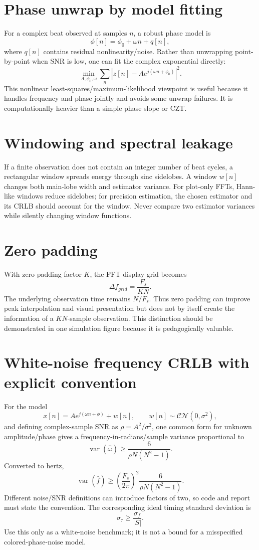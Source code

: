 \documentclass[11pt]{article}
\begin{document}
\section{Phase unwrap by model fitting}
For a complex beat observed at samples $n$, a robust phase model is
\[
\phi[n]=\phi_0+\omega n + q[n],
\]
where $q[n]$ contains residual nonlinearity/noise. Rather than unwrapping point-by-point when SNR is low, one can fit the complex exponential directly:
\[
\min_{A,\phi_0,\omega}\sum_n\left|z[n]-Ae^{j(\omega n+\phi_0)}\right|^2.
\]
This nonlinear least-squares/maximum-likelihood viewpoint is useful because it handles frequency and phase jointly and avoids some unwrap failures. It is computationally heavier than a simple phase slope or CZT.

\section{Windowing and spectral leakage}
If a finite observation does not contain an integer number of beat cycles, a rectangular window spreads energy through sinc sidelobes. A window $w[n]$ changes both main-lobe width and estimator variance. For plot-only FFTs, Hann-like windows reduce sidelobes; for precision estimation, the chosen estimator and its CRLB should account for the window. Never compare two estimator variances while silently changing window functions.

\section{Zero padding}
With zero padding factor $K$, the FFT display grid becomes
\[
\Delta f_{grid}=\frac{F_s}{KN}.
\]
The underlying observation time remains $N/F_s$. Thus zero padding can improve peak interpolation and visual presentation but does not by itself create the information of a $KN$-sample observation. This distinction should be demonstrated in one simulation figure because it is pedagogically valuable.

\section{White-noise frequency CRLB with explicit convention}
For the model
\[
x[n]=A e^{j(\omega n+\phi)}+w[n],\qquad w[n]\sim\mathcal{CN}(0,\sigma^2),
\]
and defining complex-sample SNR as $\rho=A^2/\sigma^2$, one common form for unknown amplitude/phase gives a frequency-in-radians/sample variance proportional to
\[
\operatorname{var}(\hat\omega)\ge \frac{6}{\rho N(N^2-1)}.
\]
Converted to hertz,
\[
\operatorname{var}(\hat f)\ge
\left(\frac{F_s}{2\pi}\right)^2
\frac{6}{\rho N(N^2-1)}.
\]
Different noise/SNR definitions can introduce factors of two, so code and report must state the convention. The corresponding ideal timing standard deviation is
\[
\sigma_\tau\ge \frac{\sigma_f}{|S|}.
\]
Use this only as a white-noise benchmark; it is not a bound for a misspecified colored-phase-noise model.
\end{document}
